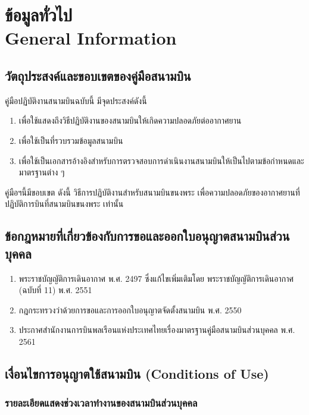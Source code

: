 

\chapter{ข้อมูลทั่วไป \\
General Information}

\section{วัตถุประสงค์และขอบเขตของคู่มือสนามบิน}

คู่มือปฏิบัติงานสนามบินฉบับนี้ มีจุดประสงค์ดังนี้
	\begin{enumerate}
	\item เพื่อใช้แสดงถึงวิธีปฏิบัติงานของสนามบินให้เกิดความปลอดภัยต่ออากาศยาน
	\item เพื่อใช้เป็นที่รวบรวมข้อมูลสนามบิน
	\item เพื่อใช้เป็นเอกสารอ้างอิงสำหรับการตรวจสอบการดำเนินงานสนามบินให้เป็นไปตามข้อกำหนดและมาตรฐานต่าง ๆ
\end{enumerate}

คู่มือฯนี้มีขอบเขต ดังนี้
วิธีการปฏิบัติงานสำหรับสนามบินขนงพระ เพื่อความปลอดภัยของอากาศยานที่ปฏิบัติการบินที่สนามบินขนงพระ เท่านั้น

\section{ข้อกฎหมายที่เกี่ยวข้องกับการขอและออกใบอนุญาตสนามบินส่วนบุคคล }

\begin{enumerate}
	\item พระราชบัญญัติการเดินอากาศ พ.ศ. 2497 ซึ่งแก้ไขเพิ่มเติมโดย พระราชบัญญัติการเดินอากาศ (ฉบับที่ 11) พ.ศ. 2551
	\item กฎกระทรวงว่าด้วยการขอและการออกใบอนุญาตจัดตั้งสนามบิน พ.ศ. 2550
	\item ประกาศสำนักงานการบินพลเรือนแห่งประเทศไทยเรื่องมาตรฐานคู่มือสนามบินส่วนบุคคล พ.ศ. 2561
\end{enumerate}

\section{เงื่อนไขการอนุญาตใช้สนามบิน (Conditions of Use)}

\subsection{รายละเอียดแสดงช่วงเวลาทำงานของสนามบินส่วนบุคคล}

